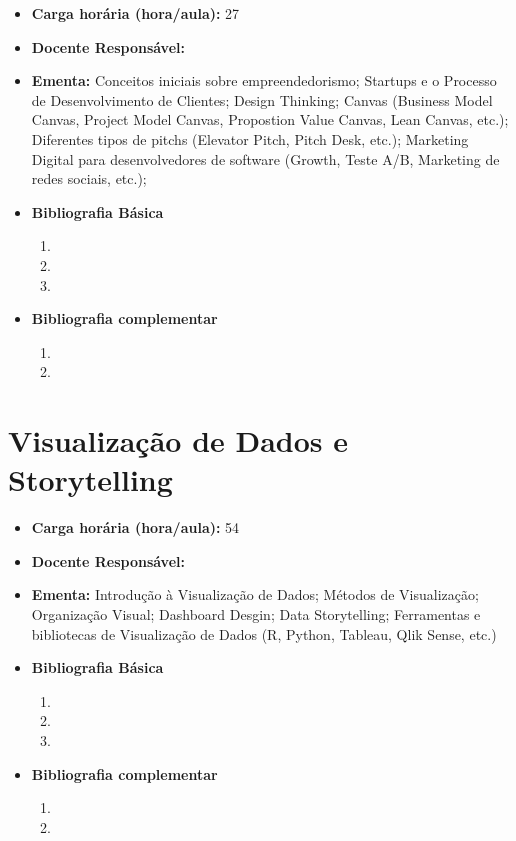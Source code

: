 \documentclass[11pt,fleqn]{book} %
\begin{document}
\begin{itemize}
	\item \textbf{Carga horária (hora/aula):} 27
	\item \textbf{Docente Responsável:}~
	\item \textbf{Ementa:} 
	Conceitos iniciais sobre empreendedorismo;
	Startups e o Processo de Desenvolvimento de Clientes;
	Design Thinking;
	Canvas (Business Model Canvas, Project Model Canvas, Propostion Value Canvas, Lean Canvas, etc.);
    Diferentes tipos de pitchs (Elevator Pitch, Pitch Desk, etc.);
    Marketing Digital para desenvolvedores de software (Growth, Teste A/B, Marketing de redes sociais, etc.);
    
	\item \textbf{Bibliografia Básica}
	\begin{enumerate}
		\item 
		\item 
		\item 
	\end{enumerate}
	\item \textbf{Bibliografia complementar}
	\begin{enumerate}
		\item 
		\item
	\end{enumerate} 	
\end{itemize}


\newpage
\section{Visualização de Dados e Storytelling}\label{disc:visstory}

\begin{itemize}
	\item \textbf{Carga horária (hora/aula):} 54
	\item \textbf{Docente Responsável:}~
	\item \textbf{Ementa:} 
	Introdução à Visualização de Dados;
	Métodos de Visualização;
	Organização Visual;
	Dashboard Desgin;
	Data Storytelling;
	Ferramentas e bibliotecas de Visualização de Dados (R, Python, Tableau, Qlik Sense, etc.)
    
	\item \textbf{Bibliografia Básica}
	\begin{enumerate}
		\item 
		\item 
		\item 
	\end{enumerate}
	\item \textbf{Bibliografia complementar}
	\begin{enumerate}
		\item 
		\item
	\end{enumerate} 	
\end{itemize}
\end{document}
